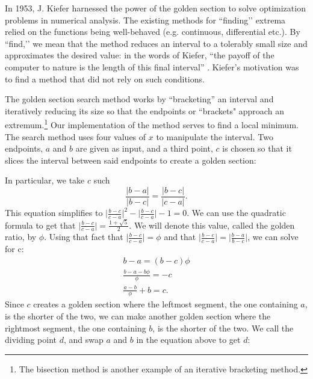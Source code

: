 \documentclass[linenumbers,RNAAS,trackchanges]{aastex631}
\begin{document}
In 1953, J. Kiefer harnessed the power of the golden section to solve optimization problems in numerical analysis. The existing methods for ``finding’’ extrema relied on the functions being well-behaved (e.g. continuous, differential etc.). By ``find,’’ we mean that the method reduces an interval to a tolerably small size and approximates the desired value: in the words of Kiefer, “the payoff of the computer to nature is the length of this final interval'' \cite{kiefer_1953}. Kiefer's motivation was to find a method that did not rely on such conditions.

The golden section search method works by ``bracketing'' an interval and iteratively reducing its size so that the endpoints or ``brackets" approach an extremum.\footnote{The bisection method is another example of an iterative bracketing method.} Our implementation of the method serves to find a local minimum. The search method uses four values of $x$ to manipulate the interval. Two endpoints, $a$ and $b$ are given as input, and a third point, $c$ is chosen so that it slices the interval between said endpoints to create a golden section:
    \begin{center}
    \end{center}
In particular, we take $c$ such $$\frac{|b-a|}{|b-c|} = \frac{|b-c|}{|c-a|}.$$ 
This equation simplifies to $\big|\frac{b-c}{c-a}\big|^2 - \big|\frac{b-c}{c-a}\big| -1 = 0$. We can use the quadratic formula to get that  $\big|\frac{b-c}{c-a} \big|= \frac{1+\sqrt{5}}{2}$. We will denote this value, called the golden ratio, by $\phi$. Using that fact that $\big|\frac{b-c}{c-a} \big|= \phi$ and that $\big|\frac{b-c}{c-a} \big|= \big|\frac{b-a}{b-c} \big|$, we can solve for c: 
    \begin{align*}
        b-a = (b-c)\phi \\
        \frac{b - a -b\phi}{\phi} = -c \\
        \frac{a - b}{\phi} + b = c.
    \end{align*}
Since $c$ creates a golden section where the leftmost segment, the one containing $a$, is the shorter of the two, we can make another golden section where the rightmost segment, the one containing $b$, is the shorter of the two. We call the dividing point $d$, and swap $a$ and $b$ in the equation above to get $d$:
\end{document}
